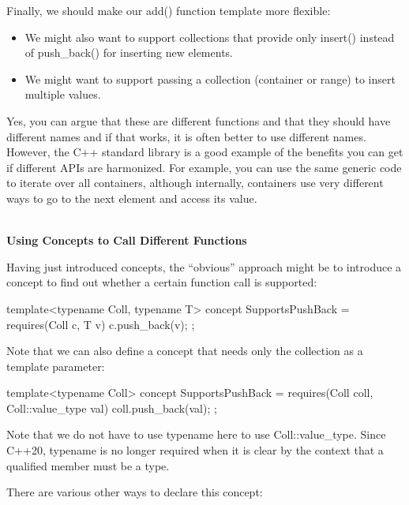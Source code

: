 Finally, we should make our add() function template more flexible:

\begin{itemize}
\item
We might also want to support collections that provide only insert() instead of push\_back() for inserting new elements.

\item
We might want to support passing a collection (container or range) to insert multiple values.
\end{itemize}

Yes, you can argue that these are different functions and that they should have different names and if that works, it is often better to use different names. However, the C++ standard library is a good example of the benefits you can get if different APIs are harmonized. For example, you can use the same generic code to iterate over all containers, although internally, containers use very different ways to go to the next element and access its value.

\noindent
\hspace*{\fill} \\ %
\textbf{Using Concepts to Call Different Functions}

Having just introduced concepts, the “obvious” approach might be to introduce a concept to find out whether a certain function call is supported:

\begin{cpp}
template<typename Coll, typename T>
concept SupportsPushBack = requires(Coll c, T v) {
	c.push_back(v);
};
\end{cpp}

Note that we can also define a concept that needs only the collection as a template parameter:

\begin{cpp}
template<typename Coll>
concept SupportsPushBack = requires(Coll coll, Coll::value_type val) {
	coll.push_back(val);
};
\end{cpp}

Note that we do not have to use typename here to use Coll::value\_type. Since C++20, typename is no longer required when it is clear by the context that a qualified member must be a type.

There are various other ways to declare this concept:

